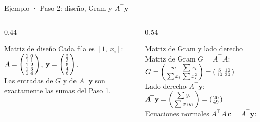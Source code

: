\documentclass[aspectratio=169,10pt]{beamer}
\begin{document}
\begin{frame}{Ejemplo · Paso 2: diseño, Gram y $A^{\!\top}\mathbf y$}
\begin{columns}[T]
\begin{column}{0.44\textwidth}
\begin{cardidea}{Matriz de diseño}{\faSuperscript}
{\footnotesize Cada fila es $[1,\ x_i]$:\\[0.8mm]
$A=\begin{psmallmatrix}1&0\\ 1&1\\ 1&2\\ 1&3\\ 1&4\end{psmallmatrix}$, \quad
$\mathbf y=\begin{psmallmatrix}2\\ 3\\ 5\\ 4\\ 6\end{psmallmatrix}$.\\[1.4mm]
Las entradas de $G$ y de $A^{\!\top}\mathbf y$ son exactamente las sumas del Paso 1.}
\end{cardidea}
\end{column}
\begin{column}{0.54\textwidth}
\begin{cardgear}{Matriz de Gram y lado derecho}{\faCalculator}
{\footnotesize Matriz de Gram $G=A^{\!\top}\!A$:\\[0.6mm]
$G=\begin{psmallmatrix} m & \sum x_i\\[1pt] \sum x_i & \sum x_i^2\end{psmallmatrix}=\begin{psmallmatrix} 5 & 10\\ 10 & 30\end{psmallmatrix}$\\[1.6mm]
Lado derecho $A^{\!\top}\mathbf y$:\\[0.4mm]
$A^{\!\top}\mathbf y=\begin{psmallmatrix} \sum y_i\\[1pt] \sum x_iy_i\end{psmallmatrix}=\begin{psmallmatrix} 20\\ 49\end{psmallmatrix}$\\[1.6mm]
Ecuaciones normales $A^{\!\top}\!A\,\mathbf c=A^{\!\top}\mathbf y$:\\[0.4mm]
}
\end{cardgear}
\end{column}
\end{columns}
\end{frame}
\end{document}
